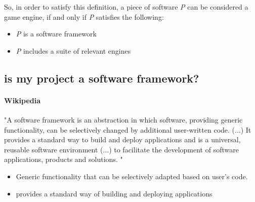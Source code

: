         So, in order to satisfy this definition, a piece of software \emph{P} can be considered a game engine, if and only if \emph{P} satisfies the following:

        \begin{itemize}
            \item \emph{P} is a software framework
            \item \emph{P} includes a suite of relevant engines
        \end{itemize}

        \subsection{is my project a software framework?}

            \paragraph*{Wikipedia} "A software framework is an abstraction in which software, providing generic functionality, can be selectively changed by additional user-written code.
            (...)
            It provides a standard way to build and deploy applications and is a universal, reusable software environment 
            (...)
            to facilitate the development of software applications, products and solutions. "
            
            \begin{itemize}
                \item Generic functionality that can be selectively adapted based on user's code.
                \item provides a standard way of building and deploying applications
            \end{itemize}



            


